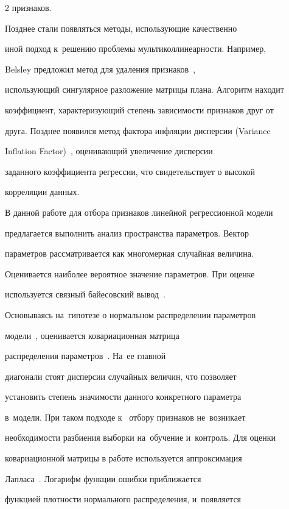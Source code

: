 \begin{multicols}{2}
признаков. 



Позднее стали появляться методы, ис\-поль\-зу\-ющие качественно

иной подход к~решению проб\-ле\-мы муль\-ти\-кол\-ли\-неар\-ности. Например,

Belsley предложил метод для удаления признаков~\cite{belsly},

использующий сингулярное разложение матрицы плана. Алгоритм находит

коэффициент, характеризующий степень зависимости признаков друг от

друга. Позднее появился метод фактора инфляции дис\-пер\-сии (Variance

Inflation Factor)~\cite{vif}, оценивающий увеличение дисперсии

заданного коэффициента регрессии, что свидетельствует о высокой

корреляции данных.



В данной работе для отбора признаков линейной регрессионной модели

предлагается выполнить анализ пространства параметров. Вектор

па\-ра\-мет\-ров рассматривается как многомерная случайная величина.

Оценивается наиболее вероятное значение параметров. При оценке

используется связный байесовский вывод~\cite{nabney, mackay}.



Основываясь на~гипотезе о нормальном распределении параметров

модели~\cite{weber}, оценивается ковариационная матрица

распределения па\-ра\-мет\-ров~\cite{strijov1, strijov2}. На~ее главной

диагонали стоят дис\-пер\-сии случайных величин, что позволяет

установить степень значимости данного конкретного па\-ра\-мет\-ра

в~модели. При таком подходе к~ отбору признаков не~возникает

необходимости разбиения выборки на~обучение и~контроль. Для оценки

ковариационной матрицы в работе используется аппроксимация

Лапласа~\cite{laplace}. Логарифм функции ошибки приближается

функцией плотности нормального распределения, и~появляется


\end{multicols}
